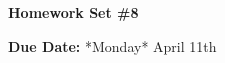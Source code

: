 


\thispagestyle{fancy}






\begin{center}
{\huge \textbf{Homework Set \#8 }}
\large

{\textbf{ Due Date:} *Monday* April 11th  } 
\end{center}

